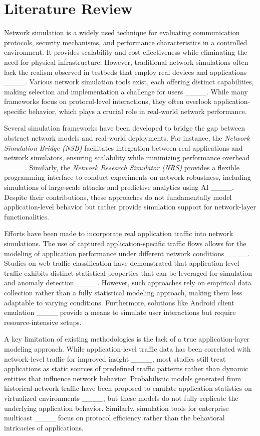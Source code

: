 \section{Literature Review}
Network simulation is a widely used technique for evaluating communication protocols, security mechanisms, and performance characteristics in a controlled environment. It provides scalability and cost-effectiveness while eliminating the need for physical infrastructure. However, traditional network simulations often lack the realism observed in testbeds that employ real devices and applications ____. Various network simulation tools exist, each offering distinct capabilities, making selection and implementation a challenge for users ____. While many frameworks focus on protocol-level interactions, they often overlook application-specific behavior, which plays a crucial role in real-world network performance.

Several simulation frameworks have been developed to bridge the gap between abstract network models and real-world deployments. For instance, the \textit{Network Simulation Bridge (NSB)} facilitates integration between real applications and network simulators, ensuring scalability while minimizing performance overhead ____. Similarly, the \textit{Network Research Simulator (NRS)} provides a flexible programming interface to conduct experiments on network robustness, including simulations of large-scale attacks and predictive analytics using AI ____. Despite their contributions, these approaches do not fundamentally model application-level behavior but rather provide simulation support for network-layer functionalities.

Efforts have been made to incorporate real application traffic into network simulations. The use of captured application-specific traffic flows allows for the modeling of application performance under different network conditions ____. Studies on web traffic classification have demonstrated that application-level traffic exhibits distinct statistical properties that can be leveraged for simulation and anomaly detection ____. However, such approaches rely on empirical data collection rather than a fully statistical modeling approach, making them less adaptable to varying conditions. Furthermore, solutions like Android client emulation ____ provide a means to simulate user interactions but require resource-intensive setups.

A key limitation of existing methodologies is the lack of a true application-layer modeling approach. While application-level traffic data has been correlated with network-level traffic for improved insight ____, most studies still treat applications as static sources of predefined traffic patterns rather than dynamic entities that influence network behavior. Probabilistic models generated from historical network traffic have been proposed to emulate application statistics on virtualized environments ____, but these models do not fully replicate the underlying application behavior. Similarly, simulation tools for enterprise multicast ____ focus on protocol efficiency rather than the behavioral intricacies of applications.

